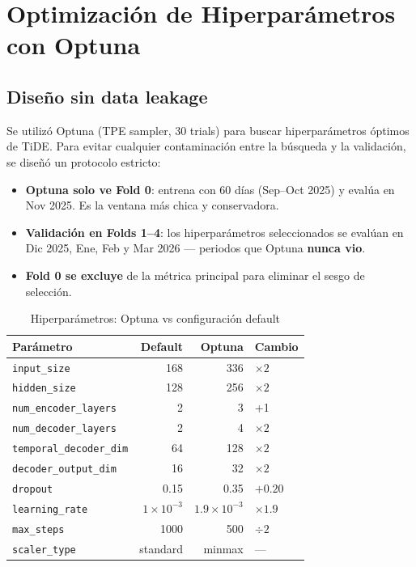 \documentclass[11pt,a4paper]{article}
\begin{document}
\section{Optimizaci\'on de Hiperpar\'ametros con Optuna}
\label{sec:optuna}

\subsection{Dise\~no sin data leakage}

Se utiliz\'o Optuna (TPE sampler, 30 trials) para buscar hiperpar\'ametros \'optimos de TiDE. Para evitar cualquier contaminaci\'on entre la b\'usqueda y la validaci\'on, se dise\~n\'o un protocolo estricto:

\begin{itemize}
    \item \textbf{Optuna solo ve Fold 0}: entrena con 60 d\'ias (Sep--Oct 2025) y eval\'ua en Nov 2025. Es la ventana m\'as chica y conservadora.
    \item \textbf{Validaci\'on en Folds 1--4}: los hiperpar\'ametros seleccionados se eval\'uan en Dic 2025, Ene, Feb y Mar 2026 --- periodos que Optuna \textbf{nunca vio}.
    \item \textbf{Fold 0 se excluye} de la m\'etrica principal para eliminar el sesgo de selecci\'on.
\end{itemize}

\begin{table}[H]
\centering
\caption{Hiperpar\'ametros: Optuna vs configuraci\'on default}
\label{tab:optuna_params}
\begin{tabular}{lrrl}
\toprule
\textbf{Par\'ametro} & \textbf{Default} & \textbf{Optuna} & \textbf{Cambio} \\
\midrule
\texttt{input\_size} & 168 & 336 & $\times 2$ \\
\texttt{hidden\_size} & 128 & 256 & $\times 2$ \\
\texttt{num\_encoder\_layers} & 2 & 3 & +1 \\
\texttt{num\_decoder\_layers} & 2 & 4 & $\times 2$ \\
\texttt{temporal\_decoder\_dim} & 64 & 128 & $\times 2$ \\
\texttt{decoder\_output\_dim} & 16 & 32 & $\times 2$ \\
\texttt{dropout} & 0.15 & 0.35 & $+0.20$ \\
\texttt{learning\_rate} & $1\times10^{-3}$ & $1.9\times10^{-3}$ & $\times 1.9$ \\
\texttt{max\_steps} & 1000 & 500 & $\div 2$ \\
\texttt{scaler\_type} & standard & minmax & --- \\
\bottomrule
\end{tabular}
\end{table}
\end{document}
